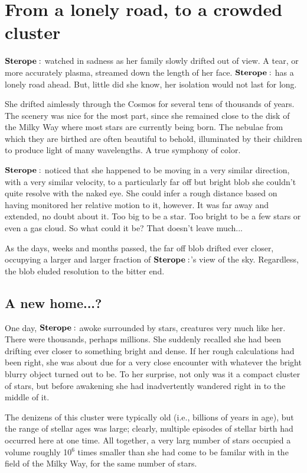 \documentclass[main.tex]{subfiles}
\begin{document}
\section{From a lonely road, to a crowded cluster}

$\Sterope$ watched in sadness as her family slowly drifted out of view.  A tear, or more accurately plasma, streamed down the length of her face.  $\Sterope$ has a lonely road ahead.  But, little did she know, her isolation would not last for long.

She drifted aimlessly through the Cosmos for several tens of thousands of years.  The scenery was nice for the most part, since she remained close to the disk of the Milky Way where most stars are currently being born.  The nebulae from which they are birthed are often beautiful to behold, illuminated by their children to produce light of many wavelengths.  A true symphony of color.  

$\Sterope$ noticed that she happened to be moving in a very similar direction, with a very similar velocity, to a particularly far off but bright blob she couldn't quite resolve with the naked eye.  She could infer a rough distance based on having monitored her relative motion to it, however.  It was far away and extended, no doubt about it.  Too big to be a star.  Too bright to be a few stars or even a gas cloud.  So what could it be?  That doesn't leave much...

As the days, weeks and months passed, the far off blob drifted ever closer, occupying a larger and larger fraction of $\Sterope$'s view of the sky.  Regardless, the blob eluded resolution to the bitter end.

\subsection{A new home...?}

One day, $\Sterope$ awoke surrounded by stars, creatures very much like her.  There were thousands, perhaps millions.  She suddenly recalled she had been drifting ever closer to something bright and dense.  If her rough calculations had been right, she was about due for a very close encounter with whatever the bright blurry object turned out to be.  To her surprise, not only was it a compact cluster of stars, but before awakening she had inadvertently wandered right in to the middle of it.

The denizens of this cluster were typically old (i.e., billions of years in age), but the range of stellar ages was large; clearly, multiple episodes of stellar birth had occurred here at one time.  All together, a very larg number of stars occupied a volume roughly 10$^6$ times smaller than she had come to be familar with in the field of the Milky Way, for the same number of stars.  
\end{document}
